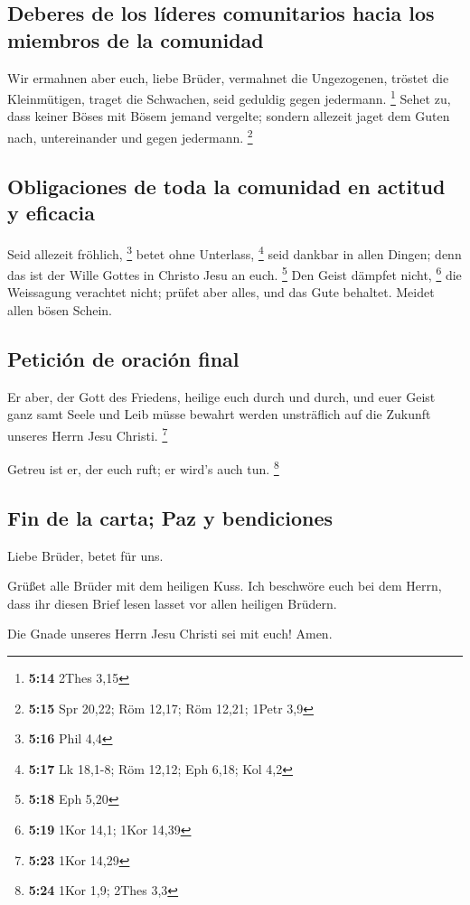 \hypertarget{deberes-de-los-luxedderes-comunitarios-hacia-los-miembros-de-la-comunidad}{%
\subsection{Deberes de los líderes comunitarios hacia los miembros de la
comunidad}\label{deberes-de-los-luxedderes-comunitarios-hacia-los-miembros-de-la-comunidad}}

 Wir ermahnen aber euch, liebe Brüder, vermahnet die
Ungezogenen, tröstet die Kleinmütigen, traget die Schwachen, seid
geduldig gegen jedermann. \footnote{\textbf{5:14} 2Thes 3,15}
 Sehet zu, dass keiner Böses mit Bösem jemand vergelte;
sondern allezeit jaget dem Guten nach, untereinander und gegen
jedermann. \footnote{\textbf{5:15} Spr 20,22; Röm 12,17; Röm 12,21;
  1Petr 3,9}

\hypertarget{obligaciones-de-toda-la-comunidad-en-actitud-y-eficacia}{%
\subsection{Obligaciones de toda la comunidad en actitud y
eficacia}\label{obligaciones-de-toda-la-comunidad-en-actitud-y-eficacia}}

 Seid allezeit fröhlich, \footnote{\textbf{5:16} Phil 4,4}
 betet ohne Unterlass, \footnote{\textbf{5:17} Lk 18,1-8;
  Röm 12,12; Eph 6,18; Kol 4,2}  seid dankbar in allen
Dingen; denn das ist der Wille Gottes in Christo Jesu an euch.
\footnote{\textbf{5:18} Eph 5,20}  Den Geist dämpfet
nicht, \footnote{\textbf{5:19} 1Kor 14,1; 1Kor 14,39} 
die Weissagung verachtet nicht;  prüfet aber alles, und
das Gute behaltet.  Meidet allen bösen Schein.

\hypertarget{peticiuxf3n-de-oraciuxf3n-final}{%
\subsection{Petición de oración
final}\label{peticiuxf3n-de-oraciuxf3n-final}}

 Er aber, der Gott des Friedens, heilige euch durch und
durch, und euer Geist ganz samt Seele und Leib müsse bewahrt werden
unsträflich auf die Zukunft unseres Herrn Jesu Christi. \footnote{\textbf{5:23}
  1Kor 14,29}

 Getreu ist er, der euch ruft; er wird's auch tun.
\footnote{\textbf{5:24} 1Kor 1,9; 2Thes 3,3}

\hypertarget{fin-de-la-carta-paz-y-bendiciones}{%
\subsection{Fin de la carta; Paz y
bendiciones}\label{fin-de-la-carta-paz-y-bendiciones}}

 Liebe Brüder, betet für uns.

 Grüßet alle Brüder mit dem heiligen Kuss.
 Ich beschwöre euch bei dem Herrn, dass ihr diesen Brief
lesen lasset vor allen heiligen Brüdern.

 Die Gnade unseres Herrn Jesu Christi sei mit euch! Amen.
